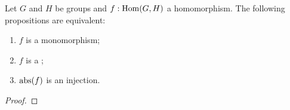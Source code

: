 \begin{lemma}\label{lem:eq-mono-cover}
Let $G$ and $H$ be groups and $f: \Hom(G,H)$ a homomorphism.
The following propositions are equivalent: %
\begin{enumerate}
\item\label{it:mono} $f$ is a monomorphism;
\item\label{it:cover} $f$ is a \covering;
\item\label{it:injection} $\mathrm{abs}(f)$ is an injection.
\end{enumerate}
\end{lemma}
\begin{proof}



\end{proof}
